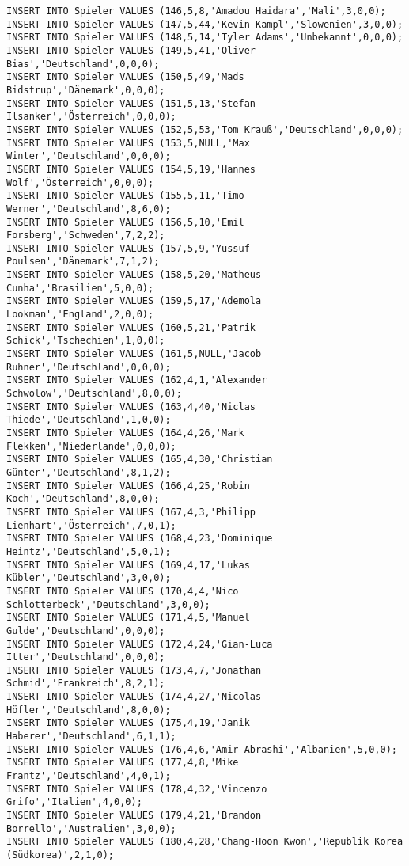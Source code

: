 \documentclass{bschlangaul-aufgabe}
\begin{document}
\begin{verbatim}
INSERT INTO Spieler VALUES (146,5,8,'Amadou Haidara','Mali',3,0,0);
INSERT INTO Spieler VALUES (147,5,44,'Kevin Kampl','Slowenien',3,0,0);
INSERT INTO Spieler VALUES (148,5,14,'Tyler Adams','Unbekannt',0,0,0);
INSERT INTO Spieler VALUES (149,5,41,'Oliver Bias','Deutschland',0,0,0);
INSERT INTO Spieler VALUES (150,5,49,'Mads Bidstrup','Dänemark',0,0,0);
INSERT INTO Spieler VALUES (151,5,13,'Stefan Ilsanker','Österreich',0,0,0);
INSERT INTO Spieler VALUES (152,5,53,'Tom Krauß','Deutschland',0,0,0);
INSERT INTO Spieler VALUES (153,5,NULL,'Max Winter','Deutschland',0,0,0);
INSERT INTO Spieler VALUES (154,5,19,'Hannes Wolf','Österreich',0,0,0);
INSERT INTO Spieler VALUES (155,5,11,'Timo Werner','Deutschland',8,6,0);
INSERT INTO Spieler VALUES (156,5,10,'Emil Forsberg','Schweden',7,2,2);
INSERT INTO Spieler VALUES (157,5,9,'Yussuf Poulsen','Dänemark',7,1,2);
INSERT INTO Spieler VALUES (158,5,20,'Matheus Cunha','Brasilien',5,0,0);
INSERT INTO Spieler VALUES (159,5,17,'Ademola Lookman','England',2,0,0);
INSERT INTO Spieler VALUES (160,5,21,'Patrik Schick','Tschechien',1,0,0);
INSERT INTO Spieler VALUES (161,5,NULL,'Jacob Ruhner','Deutschland',0,0,0);
INSERT INTO Spieler VALUES (162,4,1,'Alexander Schwolow','Deutschland',8,0,0);
INSERT INTO Spieler VALUES (163,4,40,'Niclas Thiede','Deutschland',1,0,0);
INSERT INTO Spieler VALUES (164,4,26,'Mark Flekken','Niederlande',0,0,0);
INSERT INTO Spieler VALUES (165,4,30,'Christian Günter','Deutschland',8,1,2);
INSERT INTO Spieler VALUES (166,4,25,'Robin Koch','Deutschland',8,0,0);
INSERT INTO Spieler VALUES (167,4,3,'Philipp Lienhart','Österreich',7,0,1);
INSERT INTO Spieler VALUES (168,4,23,'Dominique Heintz','Deutschland',5,0,1);
INSERT INTO Spieler VALUES (169,4,17,'Lukas Kübler','Deutschland',3,0,0);
INSERT INTO Spieler VALUES (170,4,4,'Nico Schlotterbeck','Deutschland',3,0,0);
INSERT INTO Spieler VALUES (171,4,5,'Manuel Gulde','Deutschland',0,0,0);
INSERT INTO Spieler VALUES (172,4,24,'Gian-Luca Itter','Deutschland',0,0,0);
INSERT INTO Spieler VALUES (173,4,7,'Jonathan Schmid','Frankreich',8,2,1);
INSERT INTO Spieler VALUES (174,4,27,'Nicolas Höfler','Deutschland',8,0,0);
INSERT INTO Spieler VALUES (175,4,19,'Janik Haberer','Deutschland',6,1,1);
INSERT INTO Spieler VALUES (176,4,6,'Amir Abrashi','Albanien',5,0,0);
INSERT INTO Spieler VALUES (177,4,8,'Mike Frantz','Deutschland',4,0,1);
INSERT INTO Spieler VALUES (178,4,32,'Vincenzo Grifo','Italien',4,0,0);
INSERT INTO Spieler VALUES (179,4,21,'Brandon Borrello','Australien',3,0,0);
INSERT INTO Spieler VALUES (180,4,28,'Chang-Hoon Kwon','Republik Korea (Südkorea)',2,1,0);

\end{verbatim}
\end{document}
